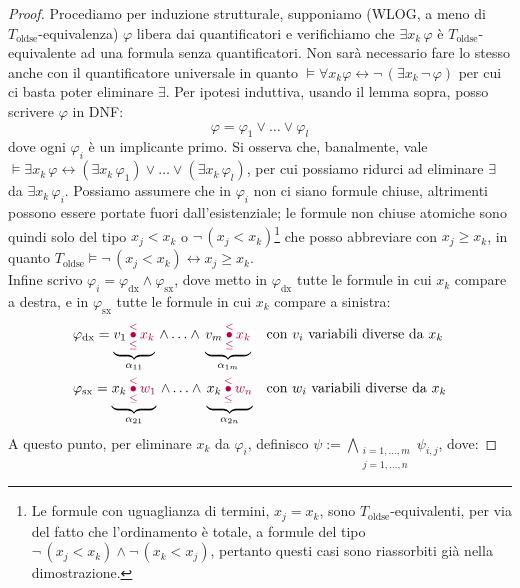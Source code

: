 \begin{proof}
    Procediamo per induzione strutturale, supponiamo (WLOG, a meno di $T_{\text{oldse}}$-equivalenza) $\varphi$ libera dai quantificatori e verifichiamo che $\exists x_k \, \varphi$ è $T_{\text{oldse}}$-equivalente ad una formula senza quantificatori. Non sarà necessario fare lo stesso anche con il quantificatore universale in quanto
    $\models \forall x_k \varphi \leftrightarrow \neg\,(\exists x_k \, \neg\, \varphi)$ per cui ci basta poter eliminare $\exists$. Per ipotesi induttiva, usando il lemma sopra, posso scrivere $\varphi$ in DNF: 
    \[ \varphi = \varphi_1 \lor \ldots \lor \varphi_l
    \]
    dove ogni $\varphi_i$ è un implicante primo. Si osserva che, banalmente, vale $\models \exists x_k \, \varphi \leftrightarrow (\exists x_k \, \varphi_1) \lor \ldots \lor (\exists x_k \, \varphi_l)$, per cui possiamo ridurci ad eliminare $\exists$ da $\exists x_k \, \varphi_i$.
    Possiamo assumere che in $\varphi_i$ non ci siano formule chiuse, altrimenti possono essere portate fuori dall'esistenziale; le formule non chiuse atomiche sono quindi solo del tipo $x_j < x_k$ o $\neg\, (x_j < x_k)$\footnote{Le formule con uguaglianza di termini, $x_j = x_k$, sono $T_{\text{oldse}}$-equivalenti, per via del
    fatto che l'ordinamento è totale, a formule del tipo $\neg\,(x_j < x_k) \land \neg\, (x_k < x_j)$, pertanto questi casi sono riassorbiti già nella dimostrazione.} che posso abbreviare con $x_j \geq x_k$, in quanto $T_{\text{oldse}} \models \neg\, (x_j < x_k) \leftrightarrow x_j \geq x_k$.\\
    Infine scrivo $\varphi_i = \varphi_{\text{dx}} \land \varphi_{\text{sx}}$, dove metto in $\varphi_{\text{dx}}$ tutte le formule in cui $x_k$ compare a destra, e in $\varphi_{\text{sx}}$ tutte le formule in cui $x_k$ compare a sinistra:
    \begin{align*}
            &\varphi_{\text{dx}} = \underbrace{v_1 \,\textcolor{purple}{\underset{\leq}{\overset{<}{\bullet}}\, x_k}}_{\alpha_{11}}\, \land \ldots \land \,\underbrace{v_m \,\textcolor{purple}{\underset{\leq}{\overset{<}{\bullet}}\, x_k}}_{\alpha_{1m}} &&\text{con $v_i$ variabili diverse da $x_k$}\\
            &\varphi_{\text{sx}} = \underbrace{x_k \,\textcolor{purple}{\underset{\leq}{\overset{<}{\bullet}}\, w_1}}_{\alpha_{21}}\, \land \ldots \land \,\underbrace{x_k \,\textcolor{purple}{\underset{\leq}{\overset{<}{\bullet}}\, w_n}}_{\alpha_{2n}} &&\text{con $w_i$ variabili diverse da $x_k$}
    \end{align*}
    A questo punto, per eliminare $x_k$ da $\varphi_i$, definisco $\psi := \bigwedge_{\substack{i=1, \ldots, m \\ j=1, \ldots, n}} \psi_{i,j}$, dove:

\end{proof}
